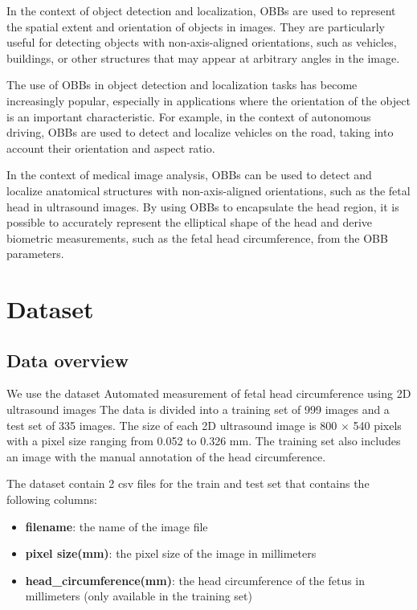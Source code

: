 \documentclass[14pt]{extreport}
\begin{document}
In the context of object detection and localization, OBBs are used to represent the spatial extent and orientation of objects in images. They are particularly useful for detecting objects with non-axis-aligned orientations, such as vehicles, buildings, or other structures that may appear at arbitrary angles in the image.

The use of OBBs in object detection and localization tasks has become increasingly popular, especially in applications where the orientation of the object is an important characteristic. For example, in the context of autonomous driving, OBBs are used to detect and localize vehicles on the road, taking into account their orientation and aspect ratio.

In the context of medical image analysis, OBBs can be used to detect and localize anatomical structures with non-axis-aligned orientations, such as the fetal head in ultrasound images. By using OBBs to encapsulate the head region, it is possible to accurately represent the elliptical shape of the head and derive biometric measurements, such as the fetal head circumference, from the OBB parameters.

\chapter{Dataset}

\section{Data overview}
We use the dataset Automated measurement of fetal head circumference using 2D ultrasound images\cite{dataset}
The data is divided into a training set of 999 images and a test set of 335 images. The size of each 2D ultrasound image is 800 $\times$ 540 pixels with a pixel size ranging from 0.052 to 0.326 mm. The training set also includes an image with the manual annotation of the head circumference.

The dataset contain 2 csv files for the train and test set that contains the following columns:
\begin{itemize}
    \item \textbf{filename}: the name of the image file
    \item \textbf{pixel size(mm)}: the pixel size of the image in millimeters
    \item \textbf{head\_circumference(mm)}: the head circumference of the fetus in millimeters (only available in the training set)
\end{itemize}
\end{document}
